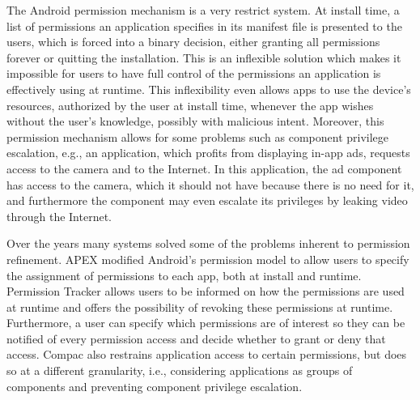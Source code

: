 
The Android permission mechanism is a very restrict system. At install time, a list of permissions an application specifies in its manifest file is presented to the users, which is forced into a binary decision, either granting all permissions forever or quitting the installation. This is an inflexible solution which makes it impossible for users to have full control of the permissions an application is effectively using at runtime. This inflexibility even allows apps to use the device's resources, authorized by the user at install time, whenever the app wishes without the user's knowledge, possibly with malicious intent. Moreover, this permission mechanism allows for some problems such as component privilege escalation, e.g., an application, which profits from displaying in-app ads, requests access to the camera and to the Internet. In this application, the ad component has access to the camera, which it should not have because there is no need for it, and furthermore the component may even escalate its privileges by leaking video through the Internet.

Over the years many systems solved some of the problems inherent to permission refinement. APEX \cite{nauman2010apex} modified Android's permission model to allow users to specify the assignment of permissions to each app, both at install and runtime. Permission Tracker \cite{kern2012permission} allows users to be informed on how the permissions are used at runtime and offers the possibility of revoking these permissions at runtime. Furthermore, a user can specify which permissions are of interest so they can be notified of every permission access and decide whether to grant or deny that access. Compac \cite{wang2014compac} also restrains application access to certain permissions, but does so at a different granularity, i.e., considering applications as groups of components and preventing component privilege escalation.

